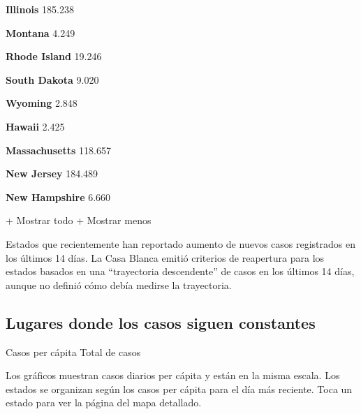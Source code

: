 \textbf{Illinois} 185.238

\href{https://www.nytimes3xbfgragh.onion/interactive/2020/us/montana-coronavirus-cases.html}{}

\textbf{Montana} 4.249

\href{https://www.nytimes3xbfgragh.onion/interactive/2020/us/rhode-island-coronavirus-cases.html}{}

\textbf{Rhode Island} 19.246

\href{https://www.nytimes3xbfgragh.onion/interactive/2020/us/south-dakota-coronavirus-cases.html}{}

\textbf{South Dakota} 9.020

\href{https://www.nytimes3xbfgragh.onion/interactive/2020/us/wyoming-coronavirus-cases.html}{}

\textbf{Wyoming} 2.848

\href{https://www.nytimes3xbfgragh.onion/interactive/2020/us/hawaii-coronavirus-cases.html}{}

\textbf{Hawaii} 2.425

\href{https://www.nytimes3xbfgragh.onion/interactive/2020/us/massachusetts-coronavirus-cases.html}{}

\textbf{Massachusetts} 118.657

\href{https://www.nytimes3xbfgragh.onion/interactive/2020/us/new-jersey-coronavirus-cases.html}{}

\textbf{New Jersey} 184.489

\href{https://www.nytimes3xbfgragh.onion/interactive/2020/us/new-hampshire-coronavirus-cases.html}{}

\textbf{New Hampshire} 6.660

+ Mostrar todo + Mostrar menos

Estados que recientemente han reportado aumento de nuevos casos
registrados en los últimos 14 días. La Casa Blanca emitió criterios de
reapertura para los estados basados en una ``trayectoria descendente''
de casos en los últimos 14 días, aunque no definió cómo debía medirse la
trayectoria.

\hypertarget{lugares-donde-los-casos-siguen-constantes}{%
\subsection{Lugares donde los casos siguen
constantes}\label{lugares-donde-los-casos-siguen-constantes}}

Casos per cápita Total de casos

Los gráficos muestran casos diarios per cápita y están en la misma
escala. Los estados se organizan según los casos per cápita para el día
más reciente. Toca un estado para ver la página del mapa detallado.

